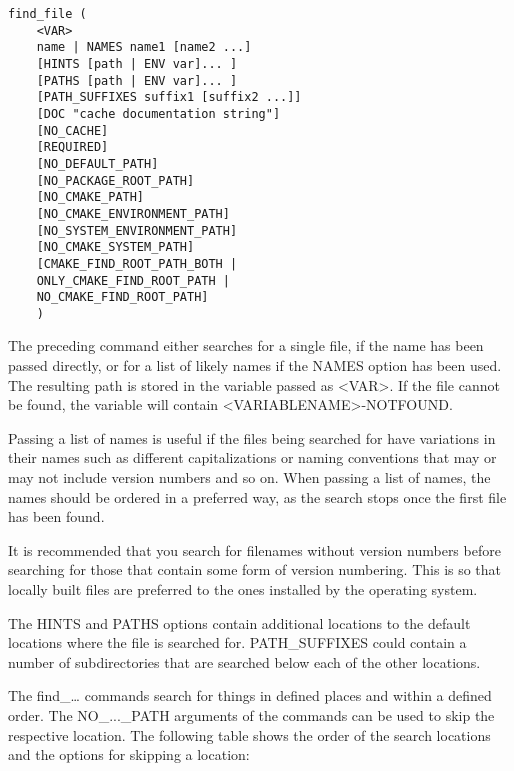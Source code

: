 \begin{lstlisting}[style=styleCMake]
find_file (
	<VAR>
	name | NAMES name1 [name2 ...]
	[HINTS [path | ENV var]... ]
	[PATHS [path | ENV var]... ]
	[PATH_SUFFIXES suffix1 [suffix2 ...]]
	[DOC "cache documentation string"]
	[NO_CACHE]
	[REQUIRED]
	[NO_DEFAULT_PATH]
	[NO_PACKAGE_ROOT_PATH]
	[NO_CMAKE_PATH]
	[NO_CMAKE_ENVIRONMENT_PATH]
	[NO_SYSTEM_ENVIRONMENT_PATH]
	[NO_CMAKE_SYSTEM_PATH]
	[CMAKE_FIND_ROOT_PATH_BOTH |
	ONLY_CMAKE_FIND_ROOT_PATH |
	NO_CMAKE_FIND_ROOT_PATH]
	)
\end{lstlisting}

The preceding command either searches for a single file, if the name has been passed directly, or for a list of likely names if the NAMES option has been used. The resulting path is stored in the variable passed as <VAR>. If the file cannot be found, the variable will contain <VARIABLENAME>-NOTFOUND.

Passing a list of names is useful if the files being searched for have variations in their names such as different capitalizations or naming conventions that may or may not include version numbers and so on. When passing a list of names, the names should be ordered in a preferred way, as the search stops once the first file has been found.

\begin{tcolorbox}[colback=blue!5!white,colframe=blue!75!black,title=Searching for Files Containing Version Numbers]
It is recommended that you search for filenames without version numbers before searching for those that contain some form of version numbering. This is so that locally built files are preferred to the ones installed by the operating system.
\end{tcolorbox}

The HINTS and PATHS options contain additional locations to the default locations where the file is searched for. PATH\_SUFFIXES could contain a number of subdirectories that are searched below each of the other locations.

The find\_… commands search for things in defined places and within a defined order. The NO\_...\_PATH arguments of the commands can be used to skip the respective location. The following table shows the order of the search locations and the options for skipping a location:

